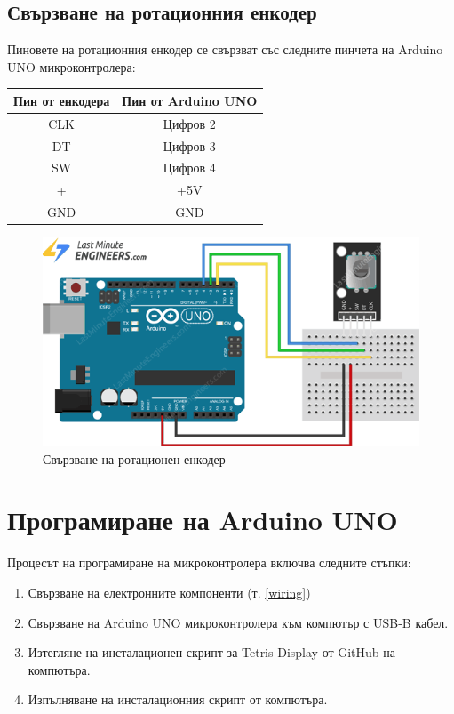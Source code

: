 \documentclass[titlepage, oneside, 14pt]{extbook}
\newcommand{\ard}{Arduino\texttrademark{}}
\begin{document}
\subsection{Свързване на ротационния енкодер}

Пиновете на ротационния енкодер се свързват със следните пинчета на \ard{} UNO микроконтролера:

\begin{center}
  \begin{tabular}{c|c}
    Пин от енкодера & Пин от \ard{} UNO \\ 
    \hline
    CLK & Цифров 2 \\  
    DT & Цифров 3 \\  
    SW & Цифров 4 \\
    + & +5V \\
    GND & GND
  \end{tabular}
\end{center}

\begin{figure}[!htbp]
    \centering
    \includegraphics[width=0.5\linewidth]{img/encoder_wiring.png}
    \caption{Свързване на ротационен енкодер}
\end{figure}

\section{Програмиране на \ard{} UNO}

Процесът на програмиране на микроконтролера включва следните стъпки:

\begin{enumerate}
  \item Свързване на електронните компоненти (т. \ref{wiring})
  \item Свързване на \ard{} UNO микроконтролера към компютър с USB-B кабел.
  \item Изтегляне на инсталационен скрипт за Tetris Display от GitHub \cite{github} на компютъра.
  \item Изпълняване на инсталационния скрипт от компютъра.
\end{enumerate}
\end{document}
